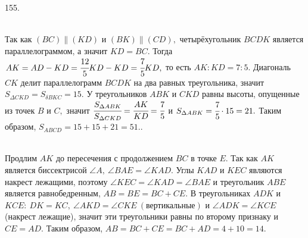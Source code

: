 \documentclass[12pt]{article}
\begin{document}
155. \begin{figure}[ht!]
\end{figure}\\
Так как $(BC)\parallel (KD)$ и $(BK)\parallel(CD),$ четырёхугольник $BCDK$ является параллелограммом, а значит $KD=BC.$ Тогда $AK=AD-KD=\cfrac{12}{5}KD-KD=\cfrac{7}{5}KD,$ то есть $AK:KD=7:5.$ Диагональ $CK$ делит параллелограмм $BCDK$ на два равных треугольника, значит $S_{\Delta CKD}=S_{\delta BKC}=15.$ У треугольников $ABK$ и $CKD$ равны высоты, опущенные из точек $B$ и $C,$ значит $\cfrac{S_{\Delta ABK}}{S_{\Delta CKD}}=\cfrac{AK}{KD}=\cfrac{7}{5}$ и $S_{\Delta ABK}=\cfrac{7}{5}\cdot15=21.$ Таким образом, $S_{ABCD}=15+15+21=51.$\newpage{}. \begin{figure}[ht!]
\end{figure}\\
Продлим $AK$ до пересечения с продолжением $BC$ в точке $E.$ Так как $AK$ является биссектрисой $\angle A,\ \angle BAE=\angle KAD.$ Углы $KAD$ и $KEC$ являются накрест лежащими, поэтому $\angle KEC=\angle KAD=\angle BAE$ и треугольник $ABE$ является равнобедренным, $AB=BE=BC+CE.$ В треугольниках $ADK$ и $KCE:\ DK=KC,\ \angle AKD=\angle CKE\ (\text{вертикальные})$ и $\angle ADK=\angle KCE$ (накрест лежащие), значит эти треугольники равны по второму признаку и $CE=AD.$ Таким образом, $AB=BC+CE=BC+AD=4+10=14.$\\
\end{document}
